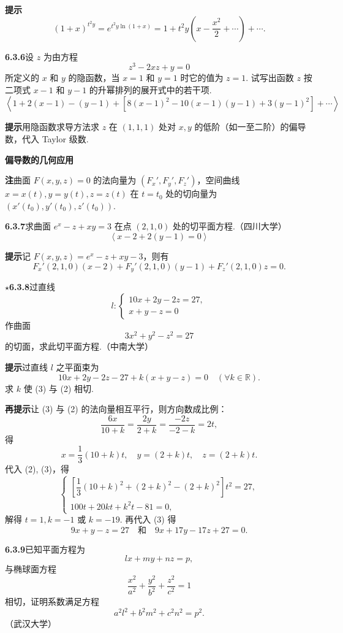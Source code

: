 \documentclass[UTF8, 12pt, fontset=fandol, oneside]{ctexart}
\begin{document}
\noindent\textbf{提示}\quad
\[
  (1+x)^{t^2y}=e^{t^2y\ln(1+x)}
  =1+t^2y\left(x-\frac{x^2}{2}+\cdots\right)+\cdots.
\]

\noindent\textbf{6.3.6}\quad 设 $z$ 为由方程
\[
  z^3-2xz+y=0
\]
所定义的 $x$ 和 $y$ 的隐函数，当 $x=1$ 和 $y=1$ 时它的值为 $z=1$. 试写出函数 $z$ 按二项式 $x-1$ 和 $y-1$ 的升幂排列的展开式中的若干项.
\[
  \left\langle
  1+2(x-1)-(y-1)+[8(x-1)^2-10(x-1)(y-1)+3(y-1)^2]+\cdots
  \right\rangle
\]

\noindent\textbf{提示}\quad 用隐函数求导方法求 $z$ 在 $(1,1,1)$ 处对 $x,y$ 的低阶（如一至二阶）的偏导数，代入 Taylor 级数.

\noindent\textbf{偏导数的几何应用}

\noindent\textbf{注}\quad 曲面 $F(x,y,z)=0$ 的法向量为 $(F_x',F_y',F_z')$，空间曲线 $x=x(t),y=y(t),z=z(t)$ 在 $t=t_0$ 处的切向量为 $(x'(t_0),y'(t_0),z'(t_0))$.

\noindent\textbf{6.3.7}\quad 求曲面 $e^x-z+xy=3$ 在点 $(2,1,0)$ 处的切平面方程.（四川大学）
\[
  \left\langle x-2+2(y-1)=0\right\rangle
\]

\noindent\textbf{提示}\quad 记 $F(x,y,z)=e^x-z+xy-3$，则有
\[
  F_x'(2,1,0)(x-2)+F_y'(2,1,0)(y-1)+F_z'(2,1,0)z=0.
\]

\noindent\textbf{\ensuremath{\star}6.3.8}\quad 过直线
\[
  l:\begin{cases}
    10x+2y-2z=27,\\
    x+y-z=0
  \end{cases} \tag{1}
\]
作曲面
\[
  3x^2+y^2-z^2=27 \tag{2}
\]
的切面，求此切平面方程.（中南大学）

\noindent\textbf{提示}\quad 过直线 $l$ 之平面束为
\[
  10x+2y-2z-27+k(x+y-z)=0\quad(\forall k\in\mathbb{R}). \tag{3}
\]
求 $k$ 使 (3) 与 (2) 相切.

\noindent\textbf{再提示}\quad 让 (3) 与 (2) 的法向量相互平行，则方向数成比例：
\[
  \frac{6x}{10+k}=\frac{2y}{2+k}=\frac{-2z}{-2-k}=2t,
\]
得
\[
  x=\frac13(10+k)t,\quad y=(2+k)t,\quad z=(2+k)t.
\]
代入 (2), (3)，得
\[
  \begin{cases}
    \left[\dfrac13(10+k)^2+(2+k)^2-(2+k)^2\right]t^2=27,\\
    100t+20kt+k^2t-81=0,
  \end{cases}
\]
解得 $t=1,k=-1$ 或 $k=-19$. 再代入 (3) 得
\[
  9x+y-z=27
  \quad\text{和}\quad
  9x+17y-17z+27=0.
\]

\noindent\textbf{6.3.9}\quad 已知平面方程为
\[
  lx+my+nz=p, \tag{1}
\]
与椭球面方程
\[
  \frac{x^2}{a^2}+\frac{y^2}{b^2}+\frac{z^2}{c^2}=1 \tag{2}
\]
相切，证明系数满足方程
\[
  a^2l^2+b^2m^2+c^2n^2=p^2. \tag{3}
\]
（武汉大学）
\end{document}
